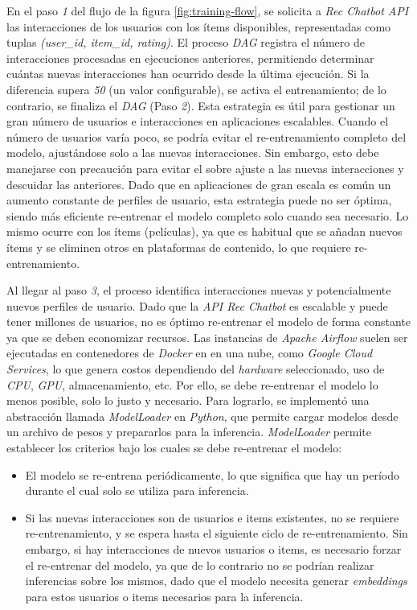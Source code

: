 \documentclass[11pt,a4paper,twoside]{thesis}
\begin{document}
En el paso \textit{1} del flujo de la figura \ref{fig:training-flow}, se solicita a \textit{Rec Chatbot API} las interacciones de los usuarios con los ítems disponibles, representadas como tuplas \textit{(user\_id, item\_id, rating)}. El proceso \textit{DAG} registra el número de interacciones procesadas en ejecuciones anteriores, permitiendo determinar cuántas nuevas interacciones han ocurrido desde la última ejecución. Si la diferencia supera \textit{50} (un valor configurable), se activa el entrenamiento; de lo contrario, se finaliza el \textit{DAG} (Paso \textit{2}). Esta estrategia es útil para gestionar un gran número de usuarios e interacciones en aplicaciones escalables. Cuando el número de usuarios varía poco, se podría evitar el re-entrenamiento completo del modelo, ajustándose solo a las nuevas interacciones. Sin embargo, esto debe manejarse con precaución para evitar el sobre ajuste a las nuevas interacciones y descuidar las anteriores. Dado que en aplicaciones de gran escala es común un aumento constante de perfiles de usuario, esta estrategia puede no ser óptima, siendo más eficiente re-entrenar el modelo completo solo cuando sea necesario. Lo mismo ocurre con los ítems (películas), ya que es habitual que se añadan nuevos ítems y se eliminen otros en plataformas de contenido, lo que requiere re-entrenamiento.


Al llegar al paso \textit{3}, el proceso identifica interacciones nuevas y potencialmente nuevos perfiles de usuario. Dado que la \textit{API Rec Chatbot} es escalable y puede tener millones de usuarios, no es óptimo re-entrenar  el modelo de forma constante ya que se deben economizar recursos. Las instancias de \textit{Apache Airflow} suelen ser ejecutadas en contenedores de \textit{Docker} en en una nube, como \textit{Google Cloud Services}, lo que genera costos dependiendo del \textit{hardware} seleccionado, uso de \textit{CPU}, \textit{GPU}, almacenamiento, etc. Por ello, se debe re-entrenar el modelo lo menos posible, solo lo justo y necesario. Para lograrlo, se implementó una abstracción llamada \textit{ModelLoader} en \textit{Python}, que permite cargar modelos desde un archivo de pesos y prepararlos para la inferencia. \textit{ModelLoader} permite establecer los criterios bajo los cuales se debe re-entrenar el modelo:

\begin{itemize}
	\item El modelo se re-entrena periódicamente, lo que significa que hay un período durante el cual solo se utiliza para inferencia.
	\item Si las nuevas interacciones son de usuarios e items existentes, no se requiere re-entrenamiento, y se espera hasta el siguiente ciclo de re-entrenamiento. Sin embargo, si hay interacciones de nuevos usuarios o items, es necesario forzar el re-entrenar  del modelo, ya que de lo contrario no se podrían realizar inferencias sobre los mismos, dado que el modelo necesita generar \textit{embeddings} para estos usuarios o items necesarios para la inferencia.
\end{itemize}
\end{document}
